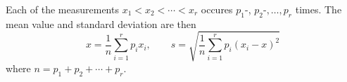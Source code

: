 \documentclass{article}
\begin{document}
Each of the measurements $x_1 < x_2 < \cdots < x_r$ occures
$p_1$-, $p_2$-$,\ldots,p_r$ times. The mean value and standard deviation
are then
\[ x = \frac{1}{n}\sum_{i=1}^r p_i x_i,\qquad s= \sqrt{\frac{1}{n}\sum_{i=1}^r
   p_i(x_i - x)^2} \]
where $ n = p_1 + p_2 +\cdots+p_r $.
\end{document}
